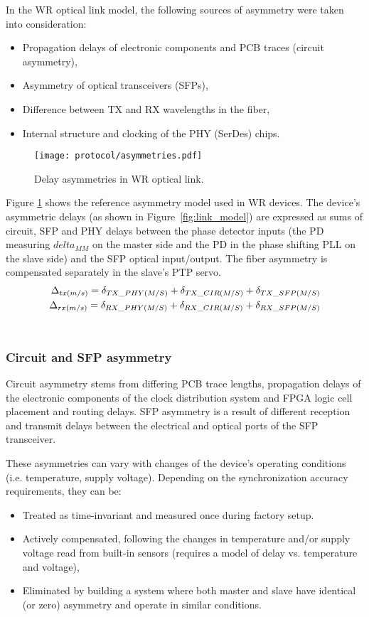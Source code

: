 In the WR optical link model, the following sources of asymmetry were taken
into consideration:
\begin {itemize}
\item Propagation delays of electronic components and PCB traces (circuit
asymmetry),
\item Asymmetry of optical transceivers (SFPs),
\item Difference between TX and RX wavelengths in the fiber,
\item Internal structure and clocking of the PHY (SerDes) chips.
\end{itemize}
\begin{figure}[ht!]
  \centering
  \texttt{[image: protocol/asymmetries.pdf]}
  \caption{Delay asymmetries in WR optical link.}
  \label{fig:asymmetries}
\end{figure}
Figure \ref{fig:asymmetries} shows the reference asymmetry model used in WR
devices. The device's asymmetric delays (as shown in Figure~\ref{fig:link_model})
are expressed as sums of circuit, SFP and PHY delays between the phase detector
inputs (the PD measuring $delta_{MM}$ on the master side and the PD in the
phase shifting PLL on the slave side) and the SFP optical input/output. The
fiber asymmetry is compensated separately in the slave's PTP servo.
\begin{eqnarray}
\Delta_{tx(m/s)} = \delta_{TX\us PHY(M/S)} + \delta_{TX\us CIR(M/S)} +
\delta_{TX\us SFP(M/S)}
\\
\Delta_{rx(m/s)} = \delta_{RX\us PHY(M/S)} + \delta_{RX\us CIR(M/S)} +
\delta_{RX\us SFP(M/S)} \nonumber
\label{eq:asym_delay}
\end{eqnarray}\\

\subsubsection{Circuit and SFP asymmetry}
Circuit asymmetry stems from differing PCB trace lengths, propagation delays
of the electronic components of the clock distribution system and FPGA logic
cell placement and routing delays. SFP asymmetry is a result of different
reception and transmit delays between the electrical and optical ports of
the SFP transceiver.

These asymmetries can vary with changes of the device's operating conditions
(i.e. temperature, supply voltage). Depending on the synchronization accuracy
requirements, they can be:
\begin{itemize}
\item Treated as time-invariant and measured once during factory setup.
\item Actively compensated, following the changes in temperature and/or supply
voltage read from built-in sensors (requires a model of delay vs. temperature
and voltage),
\item Eliminated by building a system where both master and slave have
identical (or zero) asymmetry and operate in similar conditions.
\end{itemize}

